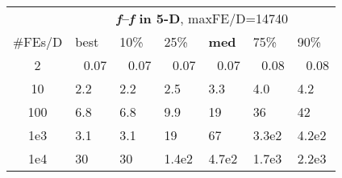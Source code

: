 \begin{tabular}{c|llllll}
 & \multicolumn{6}{|c}{\textbf{\textit{f}\raisebox{-0.35ex}{1}--\textit{f}\raisebox{-0.35ex}{3} in 5-D}, maxFE/D=14740}\\
\#FEs/D & best & 10\% & 25\% & \textbf{med} & 75\% & 90\%\\
2 & ~\,0.07 & ~\,0.07 & ~\,0.07 & ~\,0.07 & ~\,0.08 & ~\,0.08\\
10 & \hspace*{1ex}2.2 & \hspace*{1ex}2.2 & \hspace*{1ex}2.5 & \hspace*{1ex}3.3 & \hspace*{1ex}4.0 & \hspace*{1ex}4.2\\
100 & \hspace*{1ex}6.8 & \hspace*{1ex}6.8 & \hspace*{1ex}9.9 & 19 & 36 & 42\\
1e3 & \hspace*{1ex}3.1 & \hspace*{1ex}3.1 & 19 & 67 & 3.3e2 & 4.2e2\\
1e4 & 30 & 30 & 1.4e2 & 4.7e2 & 1.7e3 & 2.2e3
\end{tabular}
